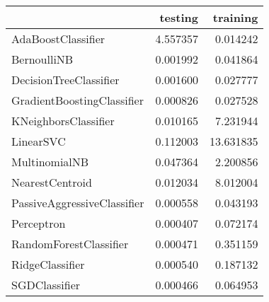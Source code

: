 \begin{tabular}{lrr}
\toprule
{} &   testing &   training \\
\midrule
AdaBoostClassifier          &  4.557357 &   0.014242 \\
BernoulliNB                 &  0.001992 &   0.041864 \\
DecisionTreeClassifier      &  0.001600 &   0.027777 \\
GradientBoostingClassifier  &  0.000826 &   0.027528 \\
KNeighborsClassifier        &  0.010165 &   7.231944 \\
LinearSVC                   &  0.112003 &  13.631835 \\
MultinomialNB               &  0.047364 &   2.200856 \\
NearestCentroid             &  0.012034 &   8.012004 \\
PassiveAggressiveClassifier &  0.000558 &   0.043193 \\
Perceptron                  &  0.000407 &   0.072174 \\
RandomForestClassifier      &  0.000471 &   0.351159 \\
RidgeClassifier             &  0.000540 &   0.187132 \\
SGDClassifier               &  0.000466 &   0.064953 \\
\bottomrule
\end{tabular}
